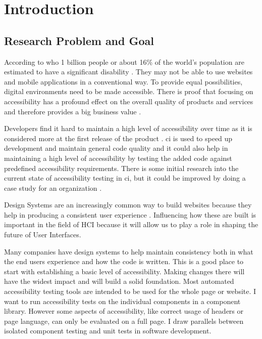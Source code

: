 \documentclass{master_thesis}
\begin{document}
\section{Introduction}

\subsection{Research Problem and Goal}



According to \ac{who} 1 billion people or about 16\% of the world's population are estimated to have a significant disability \citep{WHO2022}. They may not be able to use websites and mobile applications in a conventional way. To provide equal possibilities, digital environments need to be made accessible. There is proof that focusing on accessibility has a profound effect on the overall quality of products and services and therefore provides a big business value \citep{Miesenberger2020}.

Developers find it hard to maintain a high level of accessibility over time as it is considered more at the first release of the product \citep{Paterno2020}. \ac{ci} is used to speed up development and maintain general code quality \citep{Zhao2017} and it could also help in maintaining a high level of accessibility by testing the added code against predefined accessibility requirements. There is some initial research into the current state of accessibility testing in \ac{ci}, but it could be improved by doing a case study for an organization \citep{Sane2021}.

Design Systems are an increasingly common way to build websites because they help in producing a consistent user experience \citep{Yew2020}. Influencing how these are built is important in the field of HCI because it will allow us to play a role in shaping the future of User Interfaces.

Many companies have design systems to help maintain consistency both in what the end users experience and how the code is written. This is a good place to start with establishing a basic level of accessibility. Making changes there will have the widest impact and will build a solid foundation. Most automated accessibility testing tools are intended to be used for the whole page or website. I want to run accessibility tests on the individual components in a component library. However some aspects of accessibility, like correct usage of headers or page language, can only be evaluated on a full page. I draw parallels between isolated component testing and unit tests in software development.
\end{document}
